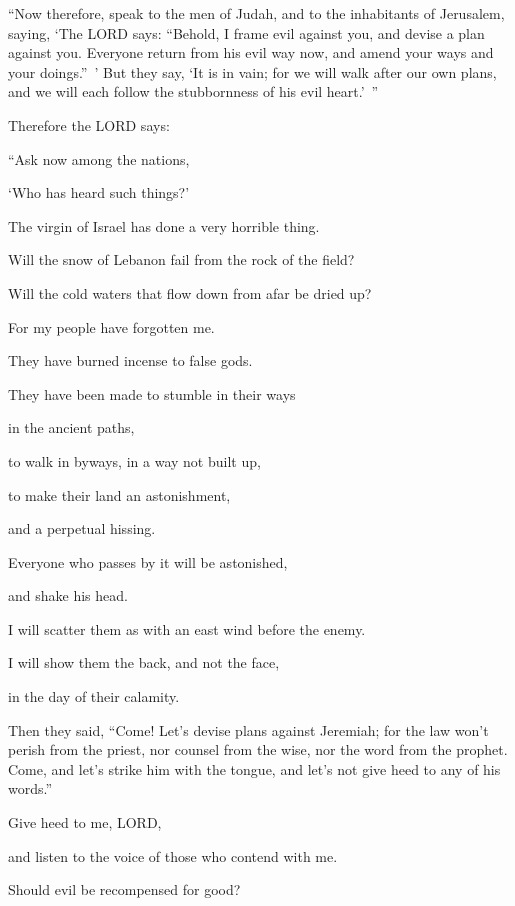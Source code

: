 \myverse{}“Now therefore, speak to the men of Judah, and to the inhabitants of Jerusalem, saying, ‘The LORD says: “Behold, I frame evil against you, and devise a plan against you. Everyone return from his evil way now, and amend your ways and your doings.” ’ \myverse{}But they say, ‘It is in vain; for we will walk after our own plans, and we will each follow the stubbornness of his evil heart.’ ”


\myverse{}Therefore the LORD says:

“Ask now among the nations,

‘Who has heard such things?’

The virgin of Israel has done a very horrible thing.


\myverse{}Will the snow of Lebanon fail from the rock of the field?

Will the cold waters that flow down from afar be dried up?


\myverse{}For my people have forgotten me.

They have burned incense to false gods.

They have been made to stumble in their ways

in the ancient paths,

to walk in byways, in a way not built up,


\myverse{}to make their land an astonishment,

and a perpetual hissing.

Everyone who passes by it will be astonished,

and shake his head.


\myverse{}I will scatter them as with an east wind before the enemy.

I will show them the back, and not the face,

in the day of their calamity.


\myverse{}Then they said, “Come! Let’s devise plans against Jeremiah; for the law won’t perish from the priest, nor counsel from the wise, nor the word from the prophet. Come, and let’s strike him with the tongue, and let’s not give heed to any of his words.”


\myverse{}Give heed to me, LORD,



and listen to the voice of those who contend with me.


\myverse{}Should evil be recompensed for good?

